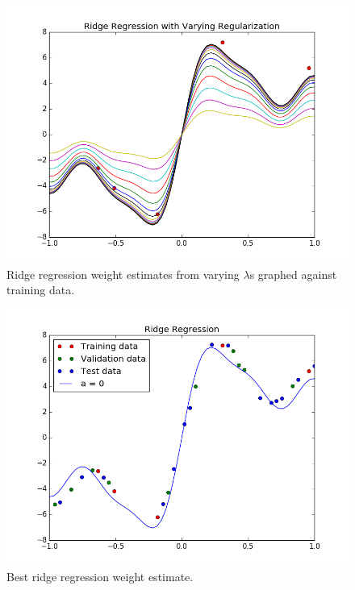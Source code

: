\documentclass[a4paper,twoside]{article}
\begin{document}
\begin{figure}[b!]
  \includegraphics[width=\linewidth]{../Figures/P4/ridge_varying.png}
  \caption{Ridge regression weight estimates from varying $\lambda$s graphed against training data.}
  \label{fig:ridge_varying}
\end{figure}

\begin{figure}[b!]
  \includegraphics[width=\linewidth]{../Figures/P4/ridge_best.png}
  \caption{Best ridge regression weight estimate.}
  \label{fig:ridge_best}
\end{figure}

\vfill
\end{document}
